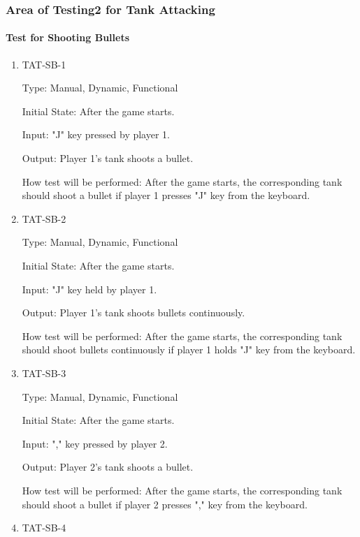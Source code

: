 \documentclass[12pt, titlepage]{article}
\begin{document}
\subsubsection{Area of Testing2 for Tank Attacking}

\paragraph{Test for Shooting Bullets}

\begin{enumerate}

\item{TAT-SB-1\\}

Type: Manual, Dynamic, Functional
					
Initial State: After the game starts.
					
Input: "J" key pressed by player 1.
					
Output: Player 1's tank shoots a bullet.
					
How test will be performed: After the game starts, the corresponding tank should shoot a bullet if player 1 presses "J" key from the keyboard.

\item{TAT-SB-2\\}

Type: Manual, Dynamic, Functional
					
Initial State: After the game starts.
					
Input: "J" key held by player 1.
					
Output: Player 1's tank shoots bullets continuously. 
					
How test will be performed: After the game starts, the corresponding tank should shoot bullets continuously if player 1 holds "J" key from the keyboard.

\item{TAT-SB-3\\}

Type: Manual, Dynamic, Functional
					
Initial State: After the game starts.
					
Input: "," key pressed by player 2.
					
Output: Player 2's tank shoots a bullet.
					
How test will be performed: After the game starts, the corresponding tank should shoot a bullet if player 2 presses "," key from the keyboard.

\item{TAT-SB-4\\}


\end{enumerate}
\end{document}
